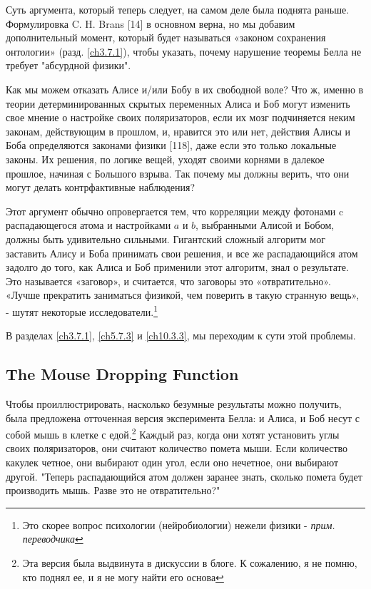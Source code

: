 \documentclass[main.tex]{subfiles}
\begin{document}
Суть аргумента, который теперь следует, на самом деле была поднята раньше. Формулировка C. H. Brans [14] в основном верна, но мы добавим дополнительный момент, который будет называться «законом сохранения онтологии» (разд. \ref{ch3.7.1}), чтобы указать, почему нарушение теоремы Белла не требует "абсурдной физики".

Как мы можем отказать Алисе и/или Бобу в их свободной воле? Что ж, именно в теории детерминированных скрытых переменных Алиса и Боб могут изменить свое мнение о настройке своих поляризаторов, если их мозг подчиняется неким законам, действующим в прошлом, и, нравится это или нет, действия Алисы и Боба определяются законами физики [118], даже если это только локальные законы. Их решения, по логике вещей, уходят своими корнями в далекое прошлое, начиная с Большого взрыва. Так почему мы должны верить, что они могут делать контрфактивные наблюдения?

Этот аргумент обычно опровергается тем, что корреляции между фотонами c распадающегося атома и настройками $a$ и $b$, выбранными Алисой и Бобом, должны быть удивительно сильными. Гигантский сложный алгоритм мог заставить Алису и Боба принимать свои решения, и все же распадающийся атом задолго до того, как Алиса и Боб применили этот алгоритм, знал о результате. Это называется «заговор», и считается, что заговоры это «отвратительно». «Лучше прекратить заниматься физикой, чем поверить в такую странную вещь», - шутят некоторые исследователи.\footnote{Это скорее вопрос психологии (нейробиологии) нежели физики - \textit{прим. переводчика}}

В разделах \ref{ch3.7.1}, \ref{ch5.7.3} и \ref{ch10.3.3}, мы переходим к сути этой проблемы.

\subsection{The Mouse Dropping Function}\label{ch3.7}

Чтобы проиллюстрировать, насколько безумные результаты можно получить, была предложена отточенная версия эксперимента Белла: и Алиса, и Боб несут с собой мышь в клетке с едой.\footnote{Эта версия была выдвинута в дискуссии в блоге. К сожалению, я не помню, кто поднял ее, и я не могу найти его основа} Каждый раз, когда они хотят установить углы своих поляризаторов, они считают количество помета мыши. Если количество какулек четное, они выбирают один угол, если оно нечетное, они выбирают другой. "Теперь распадающийся атом должен заранее знать, сколько помета будет производить мышь. Разве это не отвратительно?"
\end{document}
